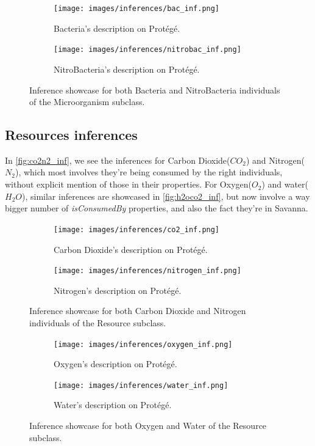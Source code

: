 \begin{figure}[h!]
    \centering
    \begin{subfigure}[b]{0.8\linewidth}
      \texttt{[image: images/inferences/bac\_inf.png]}
      \caption{Bacteria's description on Protégé.}
    \end{subfigure}
    \begin{subfigure}[b]{0.8\linewidth}
      \texttt{[image: images/inferences/nitrobac\_inf.png]}
      \caption{NitroBacteria's description on Protégé.}
    \end{subfigure}
    \caption{Inference showcase for both Bacteria and NitroBacteria individuals of the Microorganism subclass.}
    \label{fig:micro_inf}
\end{figure}

\subsection{Resources inferences}

In \autoref{fig:co2n2_inf}, we see the inferences for Carbon Dioxide($CO_{2}$) and Nitrogen($N_{2}$), which most involves they're being consumed by the right individuals, without explicit mention of those in their properties. For Oxygen($O_{2}$) and water($H_{2}O$), similar inferences are showcased in \autoref{fig:h2oco2_inf}, but now involve a way bigger number of \textit{isConsumedBy} properties, and also the fact they're in Savanna.

\begin{figure}[h!]
    \centering
    \begin{subfigure}[b]{0.8\linewidth}
      \texttt{[image: images/inferences/co2\_inf.png]}
      \caption{Carbon Dioxide's description on Protégé.}
    \end{subfigure}
    \begin{subfigure}[b]{0.8\linewidth}
      \texttt{[image: images/inferences/nitrogen\_inf.png]}
      \caption{Nitrogen's description on Protégé.}
    \end{subfigure}
    \caption{Inference showcase for both Carbon Dioxide and Nitrogen individuals of the Resource subclass.}
    \label{fig:co2n2_inf}
\end{figure}



\begin{figure}[h!]
    \centering
    \begin{subfigure}[b]{0.8\linewidth}
      \texttt{[image: images/inferences/oxygen\_inf.png]}
      \caption{Oxygen's description on Protégé.}
    \end{subfigure}
    \begin{subfigure}[b]{0.8\linewidth}
      \texttt{[image: images/inferences/water\_inf.png]}
      \caption{Water's description on Protégé.}
    \end{subfigure}
    \caption{Inference showcase for both Oxygen and Water of the Resource subclass.}
    \label{fig:h2oco2_inf}
\end{figure}

